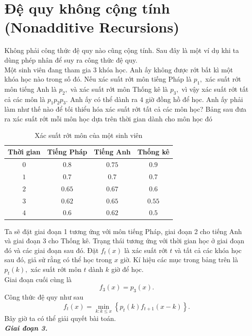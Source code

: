 \documentclass[12pt,a4paper]{article}
\begin{document}
\section{Đệ quy không cộng tính (Nonadditive Recursions)}
Không phải công thức đệ quy nào cũng cộng tính. Sau đây là một ví dụ khi ta dùng phép nhân để suy ra công thức đệ quy.\\
Một sinh viên đang tham gia \(3\) khóa học. Anh ấy không được rớt bất kì một khóa học nào trong số đó. Nếu xác suất rớt môn tiếng Pháp là \(p_1,\) xác suất rớt môn tiếng Anh là \(p_2,\) và xác suất rớt môn Thống kê là \(p_3,\) vì vậy xác suất rớt tất cả các môn là \({p_1}{p_2}{p_3}.\)  Anh ấy có thể dành ra \(4\) giờ đồng hồ để học. Anh ấy phải làm như thế nào để tối thiểu hóa xác suất rớt tất cả các môn học? Bảng sau đưa ra xác suất rớt mỗi môn học dựa trên thời gian dành cho môn học đó 
\begin{center}
\begin{table}[H]
\begin{tabular}{|c|c|c|c|}
\hline 
Thời gian & Tiếng Pháp & Tiếng Anh & Thống kê \\ 
\hline 
\(0\) & \(0.8\) & \(0.75\) & \(0.9\) \\ 
\hline 
\(1\) & \(0.7\) & \(0.7\) & \(0.7\) \\ 
\hline 
\(2\) & \(0.65\) & \(0.67\) & \(0.6\) \\ 
\hline 
\(3\) & \(0.62\) & \(0.65\) & \(0.55\) \\ 
\hline 
\(4\) & \(0.6\) & \(0.62\) & \(0.5\) \\ 
\hline 
\end{tabular} 
\caption{Xác suất rớt môn của một sinh viên}
\end{table}
\end{center}
Ta sẽ đặt giai đoạn 1 tương ứng với môn tiếng Pháp, giai đoạn 2 cho tiếng Anh và giai đoạn 3 cho Thống kê. Trạng thái tương ứng với thời gian học ở giai đoạn đó và các giai đoạn sau đó. Đặt \({f_t}\left( x \right)\) là xác suất rớt \(t\) và tất cả các khóa học sau đó, giả sử rằng có thể học trong \(x\) giờ. Kí hiệu các mục trong bảng trên là \({p_t}\left( k \right),\) xác suất rớt môn \(t\) dành \(k\) giờ để học.\\
Giai đoạn cuối cùng là 
\[{f_3}\left( x \right) = {p_3}\left( x \right).\]
Công thức đệ quy như sau
\[{f_t}\left( x \right) = \mathop {\min }\limits_{k:k \leqslant x} \left\{ {{p_t}\left( k \right){f_{t + 1}}\left( {x - k} \right)} \right\}.\]
Bây giờ ta có thể giải quyết bài toán.\\
\textbf{\textit{Giai đoạn 3.}}
\end{document}
